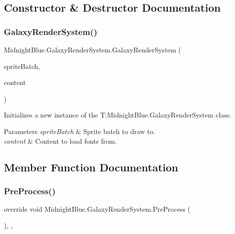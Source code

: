 \subsection{Constructor \& Destructor Documentation}
\hypertarget{class_midnight_blue_1_1_galaxy_render_system_aee5d42f0287d1bfed669e2a2656c5c28}{}\label{class_midnight_blue_1_1_galaxy_render_system_aee5d42f0287d1bfed669e2a2656c5c28} 
\subsubsection{\texorpdfstring{Galaxy\+Render\+System()}{GalaxyRenderSystem()}}
{\footnotesize\ttfamily Midnight\+Blue.\+Galaxy\+Render\+System.\+Galaxy\+Render\+System (\begin{DoxyParamCaption}\item[{Sprite\+Batch}]{sprite\+Batch,  }\item[{Content\+Manager}]{content }\end{DoxyParamCaption})\hspace{0.3cm}{\ttfamily [inline]}}



Initializes a new instance of the T\+:\+Midnight\+Blue.\+Galaxy\+Render\+System class. 


\begin{DoxyParams}{Parameters}
{\em sprite\+Batch} & Sprite batch to draw to.\\
\hline
{\em content} & Content to load fonts from.\\
\hline
\end{DoxyParams}


\subsection{Member Function Documentation}
\hypertarget{class_midnight_blue_1_1_galaxy_render_system_a269f042fe0c55e47f3b23cc1930ed71a}{}\label{class_midnight_blue_1_1_galaxy_render_system_a269f042fe0c55e47f3b23cc1930ed71a} 
\subsubsection{\texorpdfstring{Pre\+Process()}{PreProcess()}}
{\footnotesize\ttfamily override void Midnight\+Blue.\+Galaxy\+Render\+System.\+Pre\+Process (\begin{DoxyParamCaption}{ }\end{DoxyParamCaption})\hspace{0.3cm}{\ttfamily [inline]}, {\ttfamily [protected]}, {\ttfamily [virtual]}}



